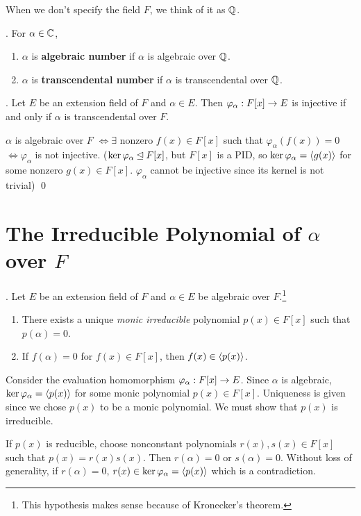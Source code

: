 When we don't specify the field \(F\), we think of it as \(\mathbb{Q}\).

. For \(\alpha \in \mathbb{C}\),
\begin{enumerate}
    \item \(\alpha\) is \textbf{algebraic number} if \(\alpha\) is algebraic over \(\mathbb{Q}\).
    \item \(\alpha\) is \textbf{transcendental number} if \(\alpha\) is transcendental over \(\mathbb{Q}\).
\end{enumerate}

\smallskip

\thm. Let \(E\) be an extension field of \(F\) and \(\alpha \in E\). Then \(\varphi_\alpha : F[x] \rightarrow E\) is injective if and only if \(\alpha\) is transcendental over \(F\).

\pf \(\alpha\) is algebraic over \(F\) \(\iff \exists\) nonzero \(f(x) \in F[x]\) such that \(\varphi_\alpha(f(x)) = 0\) \(\iff \varphi_\alpha\) is not injective. (\(\ker \varphi_\alpha \unlhd F[x]\), but \(F[x]\) is a PID, so \(\ker \varphi_\alpha = \left\langle g(x) \right\rangle\) for some nonzero \(g(x) \in F[x]\). \(\varphi_\alpha\) cannot be injective since its kernel is not trivial) \qed

\section*{The Irreducible Polynomial of \(\alpha\) over \(F\)}

\thm. Let \(E\) be an extension field of \(F\) and \(\alpha \in E\) be algebraic over \(F\).\footnote{This hypothesis makes sense because of Kronecker's theorem.}
\begin{enumerate}
    \item There exists a unique \textit{monic irreducible} polynomial \(p(x) \in F[x]\) such that \(p(\alpha) = 0\).
    \item If \(f(\alpha) = 0\) for \(f(x) \in F[x]\), then \(f(x) \in \left\langle p(x) \right\rangle\).
\end{enumerate}

\pf Consider the evaluation homomorphism \(\varphi_\alpha : F[x] \rightarrow E\). Since \(\alpha\) is algebraic, \(\ker \varphi_\alpha = \left\langle p(x) \right\rangle\) for some monic polynomial \(p(x) \in F[x]\). Uniqueness is given since we chose \(p(x)\) to be a monic polynomial. We must show that \(p(x)\) is irreducible.

 If \(p(x)\) is reducible, choose nonconstant polynomials \(r(x), s(x) \in F[x]\) such that \(p(x) = r(x)s(x)\). Then \(r(\alpha) = 0\) or \(s(\alpha) = 0\). Without loss of generality, if \(r(\alpha) = 0\), \(r(x) \in \ker \varphi_\alpha = \left\langle p(x) \right\rangle\) which is a contradiction.

